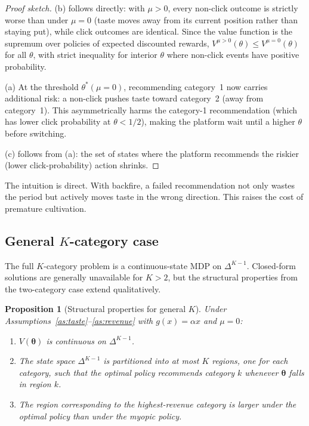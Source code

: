 \documentclass[11pt]{article}
\newtheorem{proposition}{Proposition}
\begin{document}
\begin{proof}[Proof sketch]
(b) follows directly: with $\mu > 0$, every non-click outcome is strictly worse than under $\mu = 0$ (taste moves away from its current position rather than staying put), while click outcomes are identical. Since the value function is the supremum over policies of expected discounted rewards, $V^{\mu > 0}(\theta) \le V^{\mu=0}(\theta)$ for all $\theta$, with strict inequality for interior $\theta$ where non-click events have positive probability.

(a) At the threshold $\theta^*(\mu = 0)$, recommending category~1 now carries additional risk: a non-click pushes taste toward category~2 (away from category~1). This asymmetrically harms the category-1 recommendation (which has lower click probability at $\theta < 1/2$), making the platform wait until a higher $\theta$ before switching.

(c) follows from (a): the set of states where the platform recommends the riskier (lower click-probability) action shrinks.
\end{proof}

The intuition is direct. With backfire, a failed recommendation not only wastes the period but actively moves taste in the wrong direction. This raises the cost of premature cultivation.

\subsection{General $K$-category case}

The full $K$-category problem is a continuous-state MDP on $\Delta^{K-1}$. Closed-form solutions are generally unavailable for $K > 2$, but the structural properties from the two-category case extend qualitatively.

\begin{proposition}[Structural properties for general $K$]\label{prop:general}
Under Assumptions~\ref{as:taste}--\ref{as:revenue} with $g(x) = \alpha x$ and $\mu = 0$:
\begin{enumerate}[label=(\alph*)]
\item $V(\boldsymbol{\theta})$ is continuous on $\Delta^{K-1}$.
\item The state space $\Delta^{K-1}$ is partitioned into at most $K$ regions, one for each category, such that the optimal policy recommends category $k$ whenever $\boldsymbol{\theta}$ falls in region $k$.
\item The region corresponding to the highest-revenue category is larger under the optimal policy than under the myopic policy.
\end{enumerate}
\end{proposition}
\end{document}
